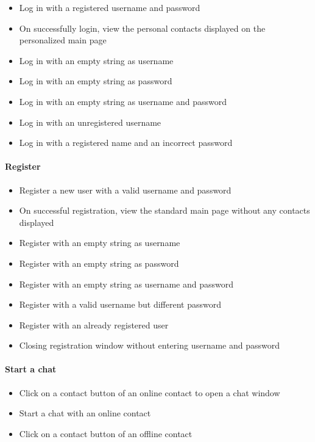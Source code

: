 \documentclass[finalReport.tex]{subfiles}
\begin{document}
\begin{itemize}
\item{Log in with a registered username and password}
\item{On successfully login, view the personal contacts displayed on the  personalized main page}
\item{Log in with an empty string as username}
\item{Log in with an empty string as password}
\item{Log in with an empty string as username and password}
\item{Log in with an unregistered username}
\item{Log in with a registered name and an incorrect password}
\end{itemize}

\paragraph{Register}

\begin{itemize}
\item{Register a new user with a valid username and password}
\item{On successful registration, view the standard main page without any contacts displayed}
\item{Register with an empty string as username}
\item{Register with an empty string as password}
\item{Register with an empty string as username and password}
\item{Register with a valid username but different password}
\item{Register with an already registered user}
\item{Closing registration window without entering username and password}
\end{itemize}

\paragraph{Start a chat}
\begin{itemize}
\item{Click on a contact button of an online contact to open a chat window}
\item{Start a chat with an online contact}
\item{Click on a contact button of an offline contact}
\end{itemize}
\end{document}
